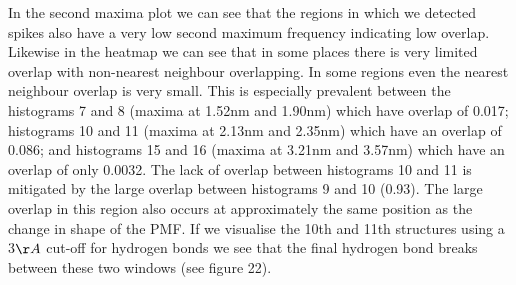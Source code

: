 \documentclass[12pt, onecolumn]{revtex4}    %
\begin{document}
In the second maxima plot we can see that the regions in which we detected spikes also have a very low second maximum frequency indicating low overlap.  Likewise in the heatmap we can see that in some places there is very limited overlap with non-nearest neighbour overlapping.  In some regions even the nearest neighbour overlap is very small.  This is especially prevalent between the histograms 7 and 8 (maxima at 1.52nm and 1.90nm) which have overlap of 0.017; histograms 10 and 11 (maxima at 2.13nm and 2.35nm) which have an overlap of 0.086; and histograms 15 and 16 (maxima at 3.21nm and 3.57nm) which have an overlap of only 0.0032.  The lack of overlap between histograms 10 and 11 is mitigated by the large overlap between histograms 9 and 10 (0.93).  The large overlap in this region also occurs at approximately the same position as the change in shape of the PMF.  If we visualise the 10th and 11th structures using a 3$\AA$ cut-off for hydrogen bonds we see that the final hydrogen bond breaks between these two windows (see figure 22).\\
\end{document}
